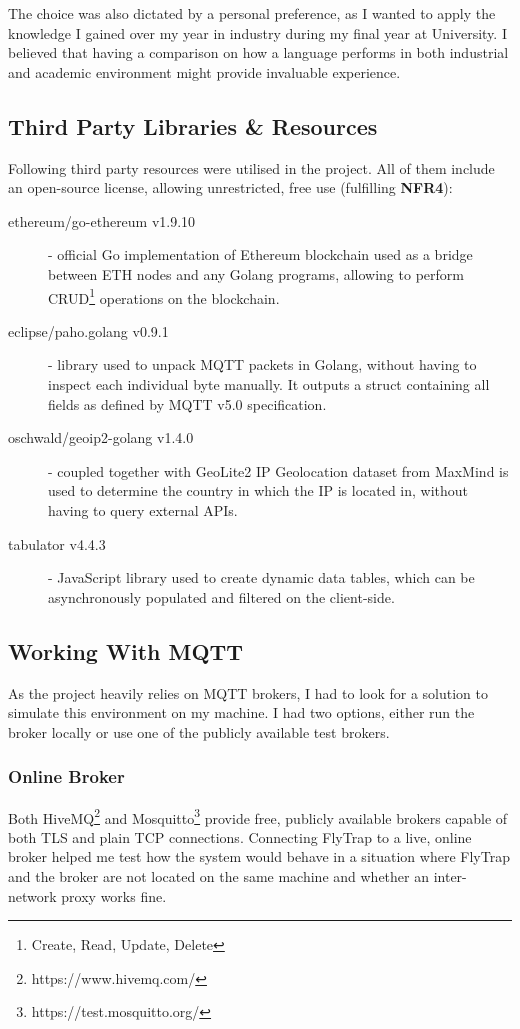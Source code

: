 The choice was also dictated by a personal preference, as I wanted to apply the knowledge I gained over my year in industry during my final year at University. I believed that having a comparison on how a language performs in both industrial and academic environment might provide invaluable experience.
\subsection{Third Party Libraries \& Resources}\label{sec:tpp}
Following third party resources were utilised in the project. All of them include an open-source license, allowing unrestricted, free use (fulfilling \textbf{NFR4}):
\begin{description}
  \item[ethereum/go-ethereum v1.9.10] \cite{ethereum2017official} - official Go implementation of Ethereum blockchain used as a bridge between ETH nodes and any Golang programs, allowing to perform CRUD\footnote{Create, Read, Update, Delete} operations on the blockchain.
    \item[eclipse/paho.golang v0.9.1] \cite{pahogolang} - library used to unpack MQTT packets in Golang, without having to inspect each individual byte manually. It outputs a struct containing all fields as defined by MQTT v5.0 specification.
    \item[oschwald/geoip2-golang v1.4.0] \cite{geoip2} - coupled together with GeoLite2 IP Geolocation dataset from MaxMind \cite{maxmind} is used to determine the country in which the IP is located in, without having to query external APIs. 
    \item[tabulator v4.4.3] \cite{tabulator} - JavaScript library used to create dynamic data tables, which can be asynchronously populated and filtered on the client-side.
\end{description}

\subsection{Working With MQTT}
As the project heavily relies on MQTT brokers, I had to look for a solution to simulate this environment on my machine. I had two options, either run the broker locally or use one of the publicly available test brokers.
\subsubsection{Online Broker}
Both HiveMQ\footnote{https://www.hivemq.com/} and Mosquitto\footnote{https://test.mosquitto.org/} provide free, publicly available brokers capable of both TLS and plain TCP connections. Connecting FlyTrap to a live, online broker helped me test how the system would behave in a situation where FlyTrap and the broker are not located on the same machine and whether an inter-network proxy works fine.
